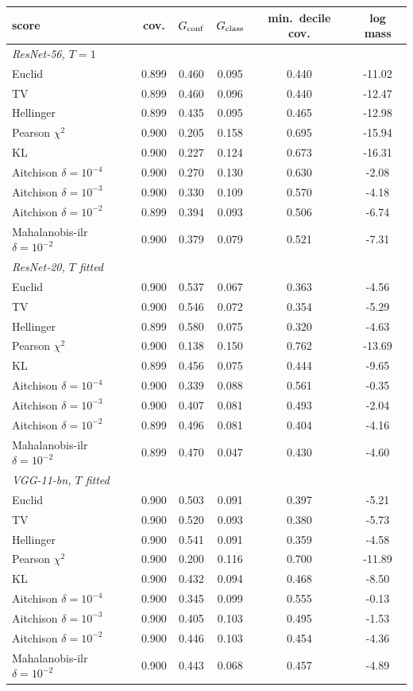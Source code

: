 \begin{tabular}{lccccc}\toprule
score & cov. & $G_{\rm conf}$ & $G_{\rm class}$ & min.\ decile cov. & log mass\\\midrule
\multicolumn{6}{l}{\emph{ResNet-56, $T{=}1$}}\\
Euclid & 0.899 & 0.460 & 0.095 & 0.440 & -11.02\\
TV & 0.899 & 0.460 & 0.096 & 0.440 & -12.47\\
Hellinger & 0.899 & 0.435 & 0.095 & 0.465 & -12.98\\
Pearson $\chi^2$ & 0.900 & 0.205 & 0.158 & 0.695 & -15.94\\
KL & 0.900 & 0.227 & 0.124 & 0.673 & -16.31\\
Aitchison $\delta{=}10^{-4}$ & 0.900 & 0.270 & 0.130 & 0.630 & -2.08\\
Aitchison $\delta{=}10^{-3}$ & 0.900 & 0.330 & 0.109 & 0.570 & -4.18\\
Aitchison $\delta{=}10^{-2}$ & 0.899 & 0.394 & 0.093 & 0.506 & -6.74\\
Mahalanobis-ilr $\delta{=}10^{-2}$ & 0.900 & 0.379 & 0.079 & 0.521 & -7.31\\
\multicolumn{6}{l}{\emph{ResNet-20, $T$ fitted}}\\
Euclid & 0.900 & 0.537 & 0.067 & 0.363 & -4.56\\
TV & 0.900 & 0.546 & 0.072 & 0.354 & -5.29\\
Hellinger & 0.899 & 0.580 & 0.075 & 0.320 & -4.63\\
Pearson $\chi^2$ & 0.900 & 0.138 & 0.150 & 0.762 & -13.69\\
KL & 0.899 & 0.456 & 0.075 & 0.444 & -9.65\\
Aitchison $\delta{=}10^{-4}$ & 0.900 & 0.339 & 0.088 & 0.561 & -0.35\\
Aitchison $\delta{=}10^{-3}$ & 0.900 & 0.407 & 0.081 & 0.493 & -2.04\\
Aitchison $\delta{=}10^{-2}$ & 0.899 & 0.496 & 0.081 & 0.404 & -4.16\\
Mahalanobis-ilr $\delta{=}10^{-2}$ & 0.899 & 0.470 & 0.047 & 0.430 & -4.60\\
\multicolumn{6}{l}{\emph{VGG-11-bn, $T$ fitted}}\\
Euclid & 0.900 & 0.503 & 0.091 & 0.397 & -5.21\\
TV & 0.900 & 0.520 & 0.093 & 0.380 & -5.73\\
Hellinger & 0.900 & 0.541 & 0.091 & 0.359 & -4.58\\
Pearson $\chi^2$ & 0.900 & 0.200 & 0.116 & 0.700 & -11.89\\
KL & 0.900 & 0.432 & 0.094 & 0.468 & -8.50\\
Aitchison $\delta{=}10^{-4}$ & 0.900 & 0.345 & 0.099 & 0.555 & -0.13\\
Aitchison $\delta{=}10^{-3}$ & 0.900 & 0.405 & 0.103 & 0.495 & -1.53\\
Aitchison $\delta{=}10^{-2}$ & 0.900 & 0.446 & 0.103 & 0.454 & -4.36\\
Mahalanobis-ilr $\delta{=}10^{-2}$ & 0.900 & 0.443 & 0.068 & 0.457 & -4.89\\
\bottomrule\end{tabular}
